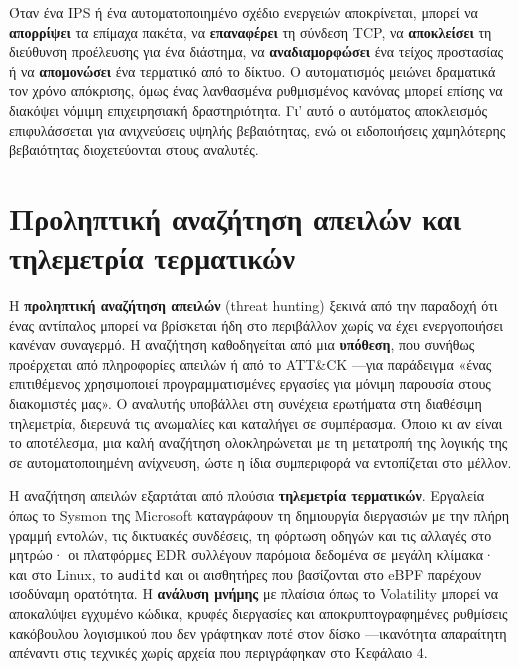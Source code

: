 \documentclass[11pt,openany]{book}
\begin{document}
Όταν ένα IPS ή ένα αυτοματοποιημένο σχέδιο ενεργειών αποκρίνεται, μπορεί να \textbf{απορρίψει} τα επίμαχα πακέτα, να \textbf{επαναφέρει} τη σύνδεση TCP, να \textbf{αποκλείσει} τη διεύθυνση προέλευσης για ένα διάστημα, να \textbf{αναδιαμορφώσει} ένα τείχος προστασίας ή να \textbf{απομονώσει} ένα τερματικό από το δίκτυο. Ο αυτοματισμός μειώνει δραματικά τον χρόνο απόκρισης, όμως ένας λανθασμένα ρυθμισμένος κανόνας μπορεί επίσης να διακόψει νόμιμη επιχειρησιακή δραστηριότητα. Γι' αυτό ο αυτόματος αποκλεισμός επιφυλάσσεται για ανιχνεύσεις υψηλής βεβαιότητας, ενώ οι ειδοποιήσεις χαμηλότερης βεβαιότητας διοχετεύονται στους αναλυτές.

\section{Προληπτική αναζήτηση απειλών και τηλεμετρία τερματικών}\label{sec:11.3}
Η \textbf{προληπτική αναζήτηση απειλών} (threat hunting) ξεκινά από την παραδοχή ότι ένας αντίπαλος μπορεί να βρίσκεται ήδη στο περιβάλλον χωρίς να έχει ενεργοποιήσει κανέναν συναγερμό. Η αναζήτηση καθοδηγείται από μια \textbf{υπόθεση}, που συνήθως προέρχεται από πληροφορίες απειλών ή από το ATT\&CK —για παράδειγμα «ένας επιτιθέμενος χρησιμοποιεί προγραμματισμένες εργασίες για μόνιμη παρουσία στους διακομιστές μας». Ο αναλυτής υποβάλλει στη συνέχεια ερωτήματα στη διαθέσιμη τηλεμετρία, διερευνά τις ανωμαλίες και καταλήγει σε συμπέρασμα. Όποιο κι αν είναι το αποτέλεσμα, μια καλή αναζήτηση ολοκληρώνεται με τη μετατροπή της λογικής της σε αυτοματοποιημένη ανίχνευση, ώστε η ίδια συμπεριφορά να εντοπίζεται στο μέλλον.

Η αναζήτηση απειλών εξαρτάται από πλούσια \textbf{τηλεμετρία τερματικών}. Εργαλεία όπως το Sysmon της Microsoft καταγράφουν τη δημιουργία διεργασιών με την πλήρη γραμμή εντολών, τις δικτυακές συνδέσεις, τη φόρτωση οδηγών και τις αλλαγές στο μητρώο· οι πλατφόρμες EDR συλλέγουν παρόμοια δεδομένα σε μεγάλη κλίμακα· και στο Linux, το \texttt{auditd} και οι αισθητήρες που βασίζονται στο eBPF παρέχουν ισοδύναμη ορατότητα. Η \textbf{ανάλυση μνήμης} με πλαίσια όπως το Volatility μπορεί να αποκαλύψει εγχυμένο κώδικα, κρυφές διεργασίες και αποκρυπτογραφημένες ρυθμίσεις κακόβουλου λογισμικού που δεν γράφτηκαν ποτέ στον δίσκο —ικανότητα απαραίτητη απέναντι στις τεχνικές χωρίς αρχεία που περιγράφηκαν στο Κεφάλαιο 4.
\end{document}

